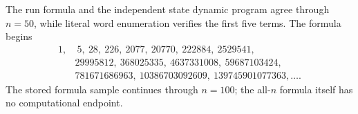 The run formula and the independent state dynamic program agree through
\(n=50\), while literal word enumeration verifies the first five terms.  The
formula begins
\begin{equation*}
\begin{aligned}
1,&\ 5,\ 28,\ 226,\ 2077,\ 20770,\ 222884,\ 2529541,\\
&29995812,\ 368025335,\ 4637331008,\ 59687103424,\\
&781671686963,\ 10386703092609,\ 139745901077363,\ldots.
\end{aligned}
\end{equation*}
The stored formula sample continues through \(n=100\); the all-\(n\) formula
itself has no computational endpoint.
